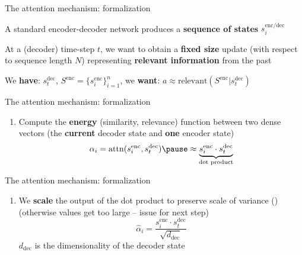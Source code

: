 \documentclass[12pt,aspectratio=169,handout]{beamer}
\newcounter{saveenumi}
\newcommand{\seti}{\setcounter{saveenumi}{\value{enumi}}}
\newcommand{\conti}{\setcounter{enumi}{\value{saveenumi}}}
\begin{document}
\begin{frame}{The attention mechanism: formalization}

A standard encoder-decoder network produces a \textbf{sequence of states} $s_{i}^{\text{enc/dec}}$
\pause

At a (decoder) time-step $t$, we want to obtain a \textbf{fixed size} update (with respect to sequence length $N$) representing \textbf{relevant information} from the past
\pause

\vspace{1em}
We \textbf{have}: $s^{\text{dec}}_t$, $S^{\text{enc}} = \{s_i^{\text{enc}}\}_{i=1}^n$, we \textbf{want}: $a \approx \text{relevant}(S^{\text{enc}}|s^{\text{dec}}_t)$
\end{frame}

\begin{frame}{The attention mechanism: formalization}

\begin{enumerate}
	\item Compute the \textbf{energy} (similarity, relevance) function between two dense vectors (the \textbf{current} decoder state and \textbf{one} encoder state)
	$$
		\alpha_i = \text{attn}(s_i^{\text{enc}}, s_t^{\text{dec}}) \pause \approx \underbrace{s_i^{\text{enc}} \cdot s_t^{\text{dec}}}_{\text{dot product}}
	$$
	\seti
\end{enumerate}

\end{frame}

\begin{frame}{The attention mechanism: formalization}
	
	\begin{enumerate}
		\conti
		\item We \textbf{scale} the output of the dot product to preserve scale of variance (\cite{Vaswani.et.al.2017}) (otherwise values get too large -- issue for next step)
			$$
				\hat{\alpha}_i = \frac{s_i^{\text{enc}} \cdot s_t^{\text{dec}}}{\sqrt{d_{\text{dec} } } }
			$$
			\pause
			$d_{\text{dec}}$ is the dimensionality of the decoder state 
		\seti
	\end{enumerate}

\end{frame}
\end{document}
